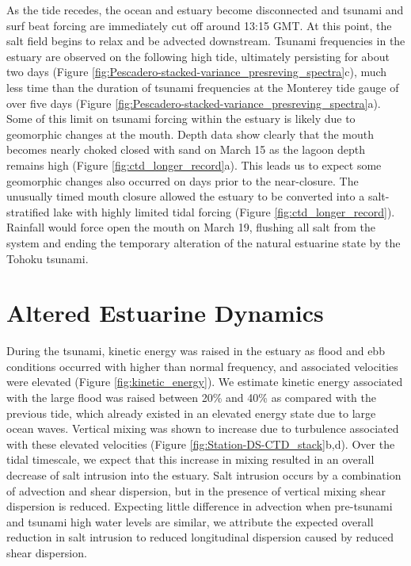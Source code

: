 As the tide recedes, the ocean and estuary become disconnected and
tsunami and surf beat forcing are immediately cut off around 13:15
GMT. At this point, the salt field begins to relax and be advected
downstream. Tsunami frequencies in the estuary are observed on the
following high tide, ultimately persisting for about two days (Figure
\ref{fig:Pescadero-stacked-variance_presreving_spectra}c), much less
time than the duration of tsunami frequencies at the Monterey tide
gauge of over five days (Figure \ref{fig:Pescadero-stacked-variance_presreving_spectra}a).
Some of this limit on tsunami forcing within the estuary is likely
due to geomorphic changes at the mouth. Depth data show clearly that
the mouth becomes nearly choked closed with sand on March 15 as the
lagoon depth remains high (Figure \ref{fig:ctd_longer_record}a).
This leads us to expect some geomorphic changes also occurred on days
prior to the near-closure. The unusually timed mouth closure allowed
the estuary to be converted into a salt-stratified lake with highly
limited tidal forcing (Figure \ref{fig:ctd_longer_record}). Rainfall
would force open the mouth on March 19, flushing all salt from the
system and ending the temporary alteration of the natural estuarine
state by the Tohoku tsunami. 


\section{Altered Estuarine Dynamics}

During the tsunami, kinetic energy was raised in the estuary as flood
and ebb conditions occurred with higher than normal frequency, and
associated velocities were elevated (Figure \ref{fig:kinetic_energy}).
We estimate kinetic energy associated with the large flood was raised
between 20\% and 40\% as compared with the previous tide, which already
existed in an elevated energy state due to large ocean waves. Vertical
mixing was shown to increase due to turbulence associated with these
elevated velocities (Figure \ref{fig:Station-DS-CTD_stack}b,d). Over
the tidal timescale, we expect that this increase in mixing resulted
in an overall decrease of salt intrusion into the estuary. Salt intrusion
occurs by a combination of advection and shear dispersion, but in
the presence of vertical mixing shear dispersion is reduced. Expecting
little difference in advection when pre-tsunami and tsunami high water
levels are similar, we attribute the expected overall reduction in
salt intrusion to reduced longitudinal dispersion caused by reduced
shear dispersion. 

